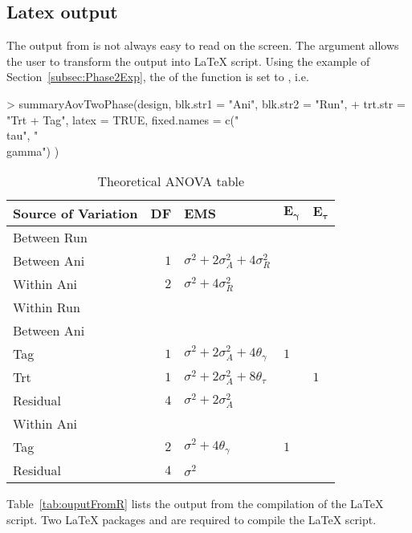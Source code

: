 \documentclass[article]{jss}
\begin{document}
\subsection{Latex output}
The output from  is not always easy to read on the screen. The argument  allows the user to transform the  output into {\LaTeX} script. Using the example of Section~\ref{subsec:Phase2Exp}, the  of the  function is set to , i.e.\
\begin{CodeChunk}
\begin{CodeInput} 
> summaryAovTwoPhase(design, blk.str1 = "Ani", blk.str2 = "Run", 
+ trt.str = "Trt + Tag", latex = TRUE, fixed.names = c("\\tau", "\\gamma") ) 
\end{CodeInput}
\begin{CodeOutput}
\begin{table}[ht]
\centering
\caption{Theoretical ANOVA table}
\begin{tabular}[t]{lrlll} 
\toprule 
\multicolumn{1}{l}{\textbf{Source of Variation}} & 
\multicolumn{1}{l}{\textbf{DF}} & \multicolumn{1}{l}{\textbf{EMS}}&
\multicolumn{1}{l}{$\bm{E_{\gamma}}$}&\multicolumn{1}{l}{$\bm{E_{\tau}}$}\\ 
\midrule 
Between Run &  &  & & \\ 
\quad Between Ani & $1$ & $\sigma^2+2\sigma_{A}^2+4\sigma_{R}^2$ & & \\ \hline 
\quad Within Ani & $2$ & $\sigma^2+4\sigma_{R}^2$ & & \\ \hline 
Within Run &  &  & & \\ 
\quad Between Ani &  &  & & \\ 
\quad \quad Tag & $1$ & $\sigma^2+2\sigma_{A}^2+4\theta_{\gamma}$ &$1$ & \\ 
\quad \quad Trt & $1$ & $\sigma^2+2\sigma_{A}^2+8\theta_{\tau}$ & & $1$\\ 
\quad \quad Residual & $4$ & $\sigma^2+2\sigma_{A}^2$ & & \\ \hline 
\quad Within Ani &  &  & & \\ 
\quad \quad Tag & $2$ & $\sigma^2+4\theta_{\gamma}$ &$1$ & \\ 
\quad \quad Residual & $4$ & $\sigma^2$ & & \\ 
\bottomrule 
\end{tabular} 
\label{tab:} 
\end{table} 
\end{CodeOutput}
\end{CodeChunk} 
Table~\ref{tab:ouputFromR} lists the output from the compilation of the {\LaTeX} script. Two {\LaTeX} packages  and  are required to compile the {\LaTeX} script. 
\end{document}
